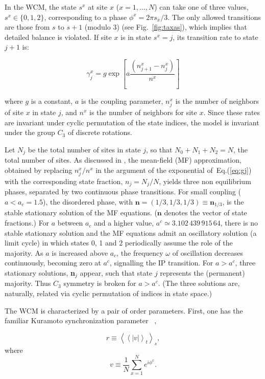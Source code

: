 In the WCM, the state $s^x$ at site $x$ ($x=1,\ldots,N$) can take one of three values, $s^x \in \{0,1,2\}$, corresponding to a phase
$\phi^x = 2 \pi s_x/3$.  The only allowed transitions are those from $s$ to $s+1$ (modulo 3) (see Fig.~\ref{fig:taxas}), which implies
that detailed balance is violated. If site $x$ is in state $s^x=j$, its transition rate to state $j+1$ is:

\begin{equation}
\label{eq:gj}
\gamma^x_j = g \exp \left[ a\frac {\left( n^x_{j+1} - n^x_j \right)} {n^x} \right]
\end{equation}

\noindent where $g$ is a constant, $a$ is the coupling parameter, $n^x_j$ is the number of neighbors of site $x$ in state $j$, and
$n^x$ is the number of neighbors for site $x$. Since these rates are invariant under cyclic permutation of the state indices, the model
is invariant under the group $C_3$ of discrete rotations.

Let $N_j$ be the total number of sites in state $j$, so that $N_0 +N_1 +N_2 = N$, the total number of sites. As discussed in
\cite{assis2011infinite}, the mean-field (MF) approximation, obtained by replacing $n^x_j/n^x$ in the argument of the exponential
of~Eq.(\ref{eq:gj}) with the corresponding state fraction, $n_j = N_j/N$, yields three non equilibrium phases, separated by two
continuous phase transitions. For small coupling ($a < a_c = 1.5$), the disordered phase, with $\textbf{n}=(1/3,1/3,1/3) \equiv
\textbf{n}_{1/3}$, is the stable stationary solution of the MF equations. ($\textbf{n}$ denotes the vector of state fractions.) For $a$
between $a_c$ and a higher value, $a^c\simeq 3.102\, 439\, 915\, 64$, there is no stable stationary solution and the MF equations admit
an oscillatory solution (a limit cycle) in which states 0, 1 and 2 periodically assume the role of the majority. As $a$ is increased
above $a_c$, the frequency $\omega$ of oscillation decreases continuously, becoming zero at $a^c$, signalling the IP transition.  For
$a> a^c$, three stationary solutions, \textbf{n}$_j$ appear, such that state $j$ represents the (permanent) majority. Thus $C_3$
symmetry is broken for $a > a^c$. (The three solutions are, naturally, related via cyclic permutation of indices in state space.) 

The WCM is characterized by a pair of order parameters. First, one has the familiar Kuramoto synchronization parameter
~\cite{Kuramoto84,Strogatz00,Wood06a},

\begin{equation}
    r \equiv \left<\left< |v| \right>_t\right>_s,
    \label{eq:r}
\end{equation}
\noindent where
\begin{equation}
    v \equiv \frac{1}{N} \sum^{N}_{x=1} e^{i\phi^x}.
    \label{eq:v}
\end{equation} 

